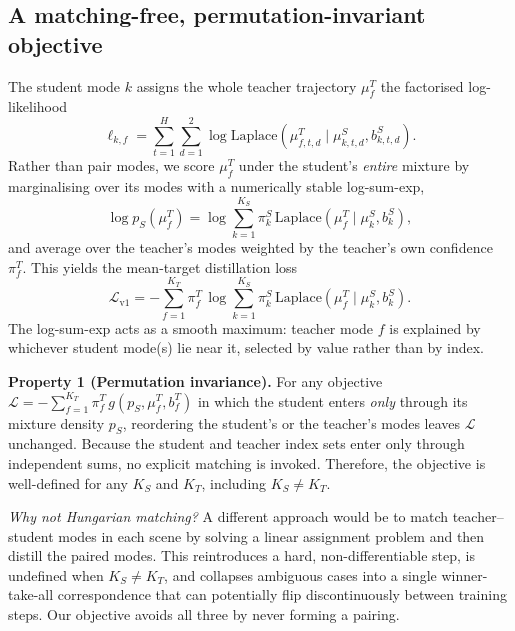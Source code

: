 \documentclass[conference]{IEEEtran}
\newcommand{\Lap}{\mathrm{Laplace}}
\newcommand{\loc}{\mu}
\newcommand{\scale}{b}
\begin{document}
\subsection{A matching-free, permutation-invariant objective}
The student mode $k$ assigns the whole teacher trajectory $\loc^T_f$ the factorised
log-likelihood
\begin{equation}
  \label{eq:traj}
  \ell_{k,f} = \textstyle\sum_{t=1}^{H}\sum_{d=1}^{2}
    \log\Lap\!\left(\loc^T_{f,t,d}\mid \loc^S_{k,t,d},\scale^S_{k,t,d}\right).
\end{equation}
Rather than pair modes, we score $\loc^T_f$ under the student's \emph{entire}
mixture by marginalising over its modes with a numerically stable log-sum-exp,
\begin{equation}
  \label{eq:mixscore}
  \log p_S\!\left(\loc^T_f\right)
   = \log\textstyle\sum_{k=1}^{K_S}\pi^S_k\,
     \Lap\!\left(\loc^T_f\mid\loc^S_k,\scale^S_k\right),
\end{equation}
and average over the teacher's modes weighted by the teacher's own confidence
$\pi^T_f$. This yields the mean-target distillation loss
\begin{equation}
  \label{eq:v1}
  \mathcal{L}_{\mathrm{v1}}
   = -\textstyle\sum_{f=1}^{K_T}\pi^T_f\,
     \log\textstyle\sum_{k=1}^{K_S}\pi^S_k\,
     \Lap\!\left(\loc^T_f\mid\loc^S_k,\scale^S_k\right).
\end{equation}
The log-sum-exp acts as a smooth maximum: teacher mode $f$ is explained by whichever
student mode(s) lie near it, selected by value rather than by index.

\textbf{Property 1 (Permutation invariance).} 
For any objective $\mathcal{L}=-\sum_{f=1}^{K_T}\pi^T_f\,g(p_S,\loc^T_f,\scale^T_f)$ in which the student enters 
\emph{only} through its mixture density $p_S$, reordering the student's or the teacher's modes leaves $\mathcal{L}$
 unchanged. Because the student and teacher index sets enter only through independent sums, no explicit matching is invoked.
Therefore, the objective is well-defined for any $K_S$ and $K_T$, including $K_S \neq K_T$.

\emph{Why not Hungarian matching?} A different approach would be to match 
teacher--student modes in each scene by solving a linear assignment problem and   
then distill the  paired modes. This
reintroduces a hard, non-differentiable step, is undefined when $K_S\neq K_T$, and
collapses ambiguous cases into a single winner-take-all correspondence that can 
potentially flip discontinuously between training steps. Our objective avoids
all three by never forming a pairing.
\end{document}
